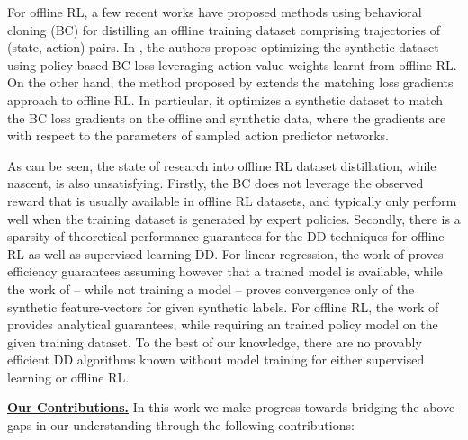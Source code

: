 For offline RL, a few recent works have proposed methods using behavioral cloning (BC)  for distilling an offline training dataset comprising trajectories of (state, action)-pairs. In \cite{lei2024offline}, the authors propose optimizing the synthetic dataset using policy-based BC loss leveraging action-value weights learnt from offline RL. On the other hand, the method proposed by \cite{light2024datasetdistillationofflinereinforcement} extends the matching loss gradients approach to offline RL. In particular, it optimizes a synthetic dataset to match the BC loss gradients on the offline and synthetic data, where the gradients are with respect to the parameters of sampled action predictor networks. 


As can be seen, the state of research into offline RL dataset distillation, while nascent, is also unsatisfying. Firstly, the BC does not leverage the observed reward that is usually available in offline RL datasets, and typically only perform well when the training dataset is generated by expert policies. Secondly, there is a sparsity of theoretical performance guarantees for the DD techniques for offline RL as well as supervised learning DD. For linear regression, the work of \cite{chen2024provable} proves efficiency guarantees assuming however that a trained model is available, while the work of \cite{nguyen2021dataset} -- while not training a model -- proves convergence only of the synthetic feature-vectors for given synthetic labels. For offline RL, the work of \cite{lei2024offline} provides analytical guarantees, while requiring an trained policy model on the given training dataset. To the best of our knowledge, there are no provably efficient DD algorithms known without model training for either supervised learning or offline RL. 



{\bf \underline{Our Contributions.}}  In this work we make progress towards bridging the above gaps in our understanding through the following contributions:

